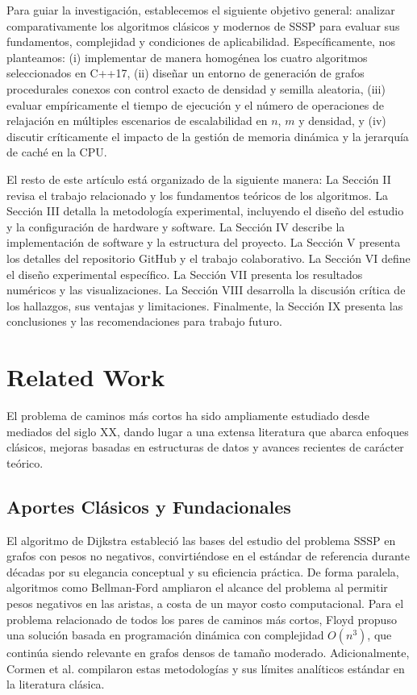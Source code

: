 \documentclass[conference]{IEEEtran}
\begin{document}
Para guiar la investigación, establecemos el siguiente objetivo general: analizar comparativamente los algoritmos clásicos y modernos de SSSP para evaluar sus fundamentos, complejidad y condiciones de aplicabilidad. Específicamente, nos planteamos: (i) implementar de manera homogénea los cuatro algoritmos seleccionados en C++17, (ii) diseñar un entorno de generación de grafos procedurales conexos con control exacto de densidad y semilla aleatoria, (iii) evaluar empíricamente el tiempo de ejecución y el número de operaciones de relajación en múltiples escenarios de escalabilidad en $n$, $m$ y densidad, y (iv) discutir críticamente el impacto de la gestión de memoria dinámica y la jerarquía de caché en la CPU.

El resto de este artículo está organizado de la siguiente manera: La Sección II revisa el trabajo relacionado y los fundamentos teóricos de los algoritmos. La Sección III detalla la metodología experimental, incluyendo el diseño del estudio y la configuración de hardware y software. La Sección IV describe la implementación de software y la estructura del proyecto. La Sección V presenta los detalles del repositorio GitHub y el trabajo colaborativo. La Sección VI define el diseño experimental específico. La Sección VII presenta los resultados numéricos y las visualizaciones. La Sección VIII desarrolla la discusión crítica de los hallazgos, sus ventajas y limitaciones. Finalmente, la Sección IX presenta las conclusiones y las recomendaciones para trabajo futuro.

\section{Related Work}

El problema de caminos más cortos ha sido ampliamente estudiado desde mediados del siglo XX, dando lugar a una extensa literatura que abarca enfoques clásicos, mejoras basadas en estructuras de datos y avances recientes de carácter teórico.

\subsection{Aportes Clásicos y Fundacionales}

El algoritmo de Dijkstra \cite{dijkstra1959} estableció las bases del estudio del problema SSSP en grafos con pesos no negativos, convirtiéndose en el estándar de referencia durante décadas por su elegancia conceptual y su eficiencia práctica. De forma paralela, algoritmos como Bellman-Ford \cite{bellman1958,ford1956} ampliaron el alcance del problema al permitir pesos negativos en las aristas, a costa de un mayor costo computacional. Para el problema relacionado de todos los pares de caminos más cortos, Floyd \cite{floyd1962} propuso una solución basada en programación dinámica con complejidad $O(n^3)$, que continúa siendo relevante en grafos densos de tamaño moderado. Adicionalmente, Cormen et al. \cite{cormen2022} compilaron estas metodologías y sus límites analíticos estándar en la literatura clásica.
\end{document}
